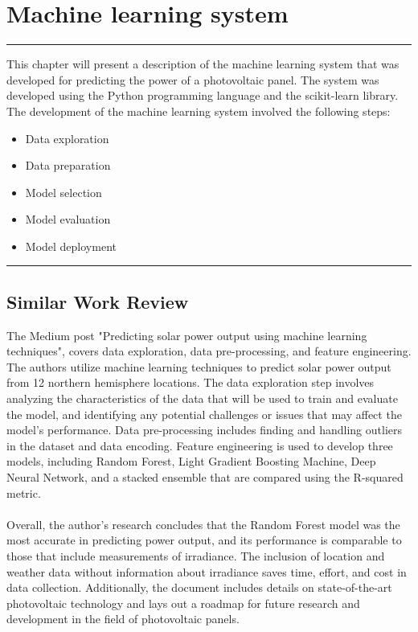 \documentclass{report}
\begin{document}
\chapter{Machine learning system}
\noindent\rule{13cm}{1.2pt}\hfill \break
This chapter will present a description of the machine learning system that was developed for predicting the power of a photovoltaic panel. The system was developed using the Python programming language and the scikit-learn library. The development of the machine learning system involved the following steps:
\begin{itemize}
    \item Data exploration
    \item Data preparation
    \item Model selection
    \item Model evaluation
    \item Model deployment
\end{itemize}
\hfill \break
\noindent\rule{13cm}{1.2pt}

\newpage
\hfill \break
\section{Similar Work Review}
The Medium post "Predicting solar power output using machine learning techniques", covers data exploration, data pre-processing, and feature engineering. The authors utilize machine learning techniques to predict solar power output from 12 northern hemisphere locations. The data exploration step involves analyzing the characteristics of the data that will be used to train and evaluate the model, and identifying any potential challenges or issues that may affect the model’s performance. Data pre-processing includes finding and handling outliers in the dataset and data encoding. Feature engineering is used to develop three models, including Random Forest, Light Gradient Boosting Machine, Deep Neural Network, and a stacked ensemble that are compared using the R-squared metric.\\
\\
Overall, the author's research concludes that the Random Forest model was the most accurate in predicting power output, and its performance is comparable to those that include measurements of irradiance. The inclusion of location and weather data without information about irradiance saves time, effort, and cost in data collection. Additionally, the document includes details on state-of-the-art photovoltaic technology and lays out a roadmap for future research and development in the field of photovoltaic panels.
\end{document}
